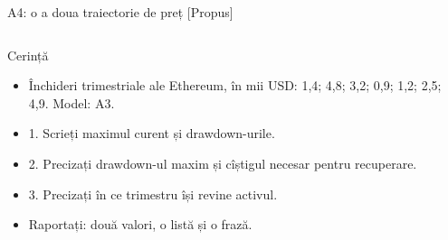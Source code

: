 \begin{frame}{A4: o a doua traiectorie de preț [Propus]}
\propsub
\itemsize{\scriptsize}
\begin{columns}[T]
\begin{column}{\taskw}
\begin{block}{Cerință}
\begin{itemize}
    \item Închideri trimestriale ale Ethereum, în mii USD: 1,4; 4,8; 3,2; 0,9; 1,2; 2,5; 4,9. Model: A3.
    \item 1. Scrieți maximul curent și drawdown-urile.
    \item 2. Precizați drawdown-ul maxim și cîștigul necesar pentru recuperare.
    \item 3. Precizați în ce trimestru își revine activul.
    \item Raportați: două valori, o listă și o frază.
\end{itemize}
\end{block}
\end{column}
\begin{column}{\solw}
\end{column}
\end{columns}
\end{frame}

